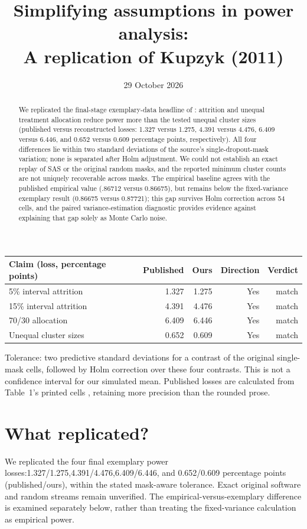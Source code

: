 \documentclass[11pt]{article}
\title{Simplifying assumptions in power analysis:\\A replication of Kupzyk (2011)}
\date{29 October 2026}
\begin{document}
\maketitle\vspace{-2em}
\begin{abstract}
We replicated the final-stage exemplary-data headline of \citet{kupzyk2011}: attrition and unequal treatment allocation reduce power more than the tested unequal cluster sizes (published versus reconstructed losses: 1.327 versus 1.275, 4.391 versus 4.476, 6.409 versus 6.446, and 0.652 versus 0.609 percentage points, respectively). All four differences lie within two standard deviations of the source's single-dropout-mask variation; none is separated after Holm adjustment. We could not establish an exact replay of SAS or the original random masks, and the reported minimum cluster counts are not uniquely recoverable across masks. The empirical baseline agrees with the published empirical value (.86712 versus 0.86675), but remains below the fixed-variance exemplary result (0.86675 versus 0.87721); this gap survives Holm correction across 54 cells, and the paired variance-estimation diagnostic provides evidence against explaining that gap solely as Monte Carlo noise.
\end{abstract}
\begin{center}\small
\begin{tabular}{p{.25\linewidth}rrrr}
\toprule Claim (loss, percentage points)&Published&Ours&Direction&Verdict\\\midrule
5\% interval attrition&1.327&1.275&Yes&match\\
15\% interval attrition&4.391&4.476&Yes&match\\
70/30 allocation&6.409&6.446&Yes&match\\
Unequal cluster sizes&0.652&0.609&Yes&match\\
\bottomrule\end{tabular}
\end{center}
{\footnotesize Tolerance: two predictive standard deviations for a contrast of the original single-mask cells, followed by Holm correction over these four contrasts. This is not a confidence interval for our simulated mean. Published losses are calculated from Table~1's printed cells \citep[p.~92]{kupzyk2011}, retaining more precision than the rounded prose.}
\section{What replicated?}
We replicated the four final exemplary power losses:1.327/1.275,4.391/4.476,6.409/6.446, and 0.652/0.609 percentage points (published/ours), within the stated mask-aware tolerance. Exact original software and random streams remain unverified. The empirical-versus-exemplary difference is examined separately below, rather than treating the fixed-variance calculation as empirical power.
\end{document}
